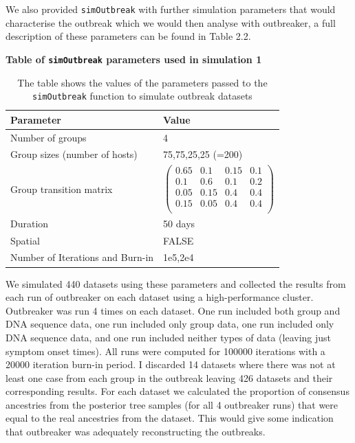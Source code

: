\documentclass[11pt,a4paper]{report}
\begin{document}
We also provided {\tt simOutbreak} with further simulation parameters that would characterise the outbreak which we would then analyse with outbreaker, a full description of these parameters can be found in Table 2.2.
\begin{table}[h!]
\centering
{\bf Table of {\tt simOutbreak} parameters used in simulation 1}
\caption{The table shows the values of the parameters passed to the {\tt simOutbreak} function to simulate outbreak datasets}
\begin{tabular}{|l|l|}
\hline
Parameter & Value \\
\hline
Number of groups & 4 \\
\hline
Group sizes (number of hosts) & 75,75,25,25 (=200) \\
\hline
Group transition matrix &  
$
\begin{pmatrix}
	0.65 & 0.1 & 0.15 & 0.1 \\
	0.1 & 0.6 & 0.1 & 0.2 \\
	0.05 & 0.15 & 0.4 & 0.4 \\
	0.15 & 0.05 & 0.4 & 0.4 \\
\end{pmatrix}
$ \\
\hline
Duration & 50 days \\
\hline
Spatial & FALSE \\
\hline
Number of Iterations and Burn-in & 1e5,2e4 \\
\hline
\end{tabular}
\end{table}

We simulated 440 datasets using these parameters and collected the results from each run of outbreaker on each dataset using a high-performance cluster. Outbreaker was run 4 times on each dataset. One run included both group and DNA sequence data, one run included only group data, one run included only DNA sequence data, and one run included neither types of data (leaving just symptom onset times). All runs were computed for 100000 iterations with a 20000 iteration burn-in period. I discarded 14 datasets where there was not at least one case from each group in the outbreak leaving 426 datasets and their corresponding results. For each dataset we calculated the proportion of consensus ancestries from the posterior tree samples (for all 4 outbreaker runs) that were equal to the real ancestries from the dataset. This would give some indication that outbreaker was adequately reconstructing the outbreaks.
\end{document}
